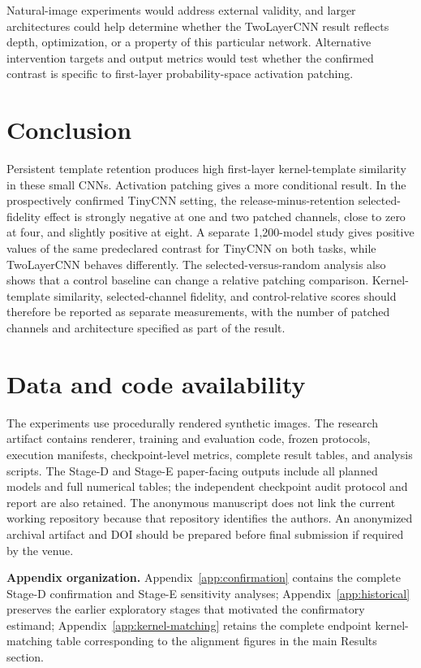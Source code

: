 \documentclass[10pt]{article}
\begin{document}
Natural-image experiments would address external validity, and larger architectures could help determine whether the TwoLayerCNN result reflects depth, optimization, or a property of this particular network. Alternative intervention targets and output metrics would test whether the confirmed contrast is specific to first-layer probability-space activation patching.

\section{Conclusion}\label{sec:conclusion}

Persistent template retention produces high first-layer kernel-template similarity in these small CNNs. Activation patching gives a more conditional result. In the prospectively confirmed TinyCNN setting, the release-minus-retention selected-fidelity effect is strongly negative at one and two patched channels, close to zero at four, and slightly positive at eight. A separate 1,200-model study gives positive values of the same predeclared contrast for TinyCNN on both tasks, while TwoLayerCNN behaves differently. The selected-versus-random analysis also shows that a control baseline can change a relative patching comparison. Kernel-template similarity, selected-channel fidelity, and control-relative scores should therefore be reported as separate measurements, with the number of patched channels and architecture specified as part of the result.

\section{Data and code availability}\label{sec:availability}

The experiments use procedurally rendered synthetic images. The research artifact contains renderer, training and evaluation code, frozen protocols, execution manifests, checkpoint-level metrics, complete result tables, and analysis scripts. The Stage-D and Stage-E paper-facing outputs include all planned models and full numerical tables; the independent checkpoint audit protocol and report are also retained. The anonymous manuscript does not link the current working repository because that repository identifies the authors. An anonymized archival artifact and DOI should be prepared before final submission if required by the venue.



\clearpage
\appendix
\noindent\textbf{Appendix organization.} Appendix~\ref{app:confirmation} contains the complete Stage-D confirmation and Stage-E sensitivity analyses; Appendix~\ref{app:historical} preserves the earlier exploratory stages that motivated the confirmatory estimand; Appendix~\ref{app:kernel-matching} retains the complete endpoint kernel-matching table corresponding to the alignment figures in the main Results section.


\clearpage

\clearpage

\end{document}
